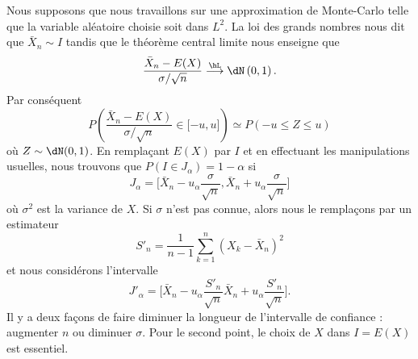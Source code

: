 Nous supposons que nous travaillons sur une approximation de Monte-Carlo telle que la variable aléatoire choisie soit dans \( L^2\). La loi des grands nombres nous dit que \( \bar X_n\sim I\) tandis que le théorème central limite nous enseigne que
\begin{equation}
	\frac{ \bar X_n-E(X) }{ \sigma/\sqrt{n} }\stackrel{\hL}{\longrightarrow}\dN\left( 0,1 \right).
\end{equation}
Par conséquent
\begin{equation}
	P\left( \frac{ \bar X_n-E(X) }{ \sigma/\sqrt{n} }\in\mathopen[ -u , u \mathclose] \right)\simeq P(-u\leq Z\leq u)
\end{equation}
où \( Z\sim\dN(0,1)\). En remplaçant \( E(X)\) par \( I\) et en effectuant les manipulations usuelles, nous trouvons que \( P(I\in J_{\alpha})=1-\alpha\) si
\begin{equation}
	J_{\alpha}=\big[ \bar X_n-u_{\alpha}\frac{ \sigma }{ \sqrt{n} },\bar X_n+u_{\alpha}\frac{ \sigma }{ \sqrt{n} } \big]
\end{equation}
où \( \sigma^2\) est la variance de \( X\). Si \( \sigma\) n'est pas connue, alors nous le remplaçons par un estimateur
\begin{equation}
	S'_n=\frac{1}{ n-1 }\sum_{k=1}^n(X_k-\bar X_n)^2
\end{equation}
et nous considérons l'intervalle
\begin{equation}
	J'_{\alpha}=\big[ \bar X_n-u_{\alpha}\frac{ S'_n }{ \sqrt{n} }\bar X_n+u_{\alpha}\frac{ S'_n }{ \sqrt{n} } \big].
\end{equation}
Il y a deux façons de faire diminuer la longueur de l'intervalle de confiance : augmenter \( n\) ou diminuer \( \sigma\). Pour le second point, le choix de \( X\) dans \( I=E(X)\) est essentiel.

